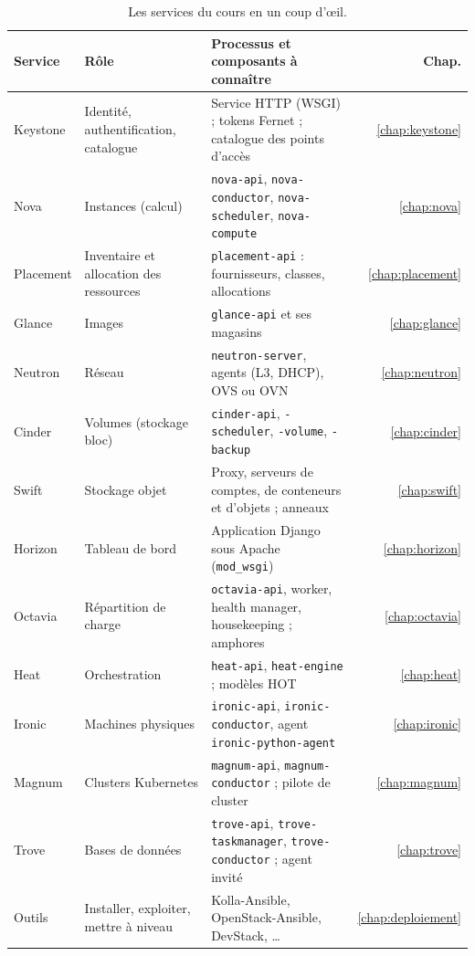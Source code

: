 \begin{table}[!ht]
\centering
\renewcommand{\arraystretch}{1.25}
\small
\begin{tabular}{@{}>{\raggedright\arraybackslash}p{2.0cm}>{\raggedright\arraybackslash}p{3.9cm}>{\raggedright\arraybackslash}p{8.3cm}r@{}}
\toprule
\textbf{Service} & \textbf{Rôle} & \textbf{Processus et composants à connaître} & \textbf{Chap.} \\
\midrule
Keystone & Identité, authentification, catalogue & Service HTTP (WSGI) ; tokens Fernet ; catalogue des points d'accès & \ref{chap:keystone} \\
Nova & Instances (calcul) & \texttt{nova-api}, \texttt{nova-conductor}, \texttt{nova-scheduler}, \texttt{nova-compute} & \ref{chap:nova} \\
Placement & Inventaire et allocation des ressources & \texttt{placement-api} : fournisseurs, classes, allocations & \ref{chap:placement} \\
Glance & Images & \texttt{glance-api} et ses magasins & \ref{chap:glance} \\
Neutron & Réseau & \texttt{neutron-server}, agents (L3, DHCP), OVS ou OVN & \ref{chap:neutron} \\
Cinder & Volumes (stockage bloc) & \texttt{cinder-api}, \texttt{-scheduler}, \texttt{-volume}, \texttt{-backup} & \ref{chap:cinder} \\
Swift & Stockage objet & Proxy, serveurs de comptes, de conteneurs et d'objets ; anneaux & \ref{chap:swift} \\
Horizon & Tableau de bord & Application Django sous Apache (\texttt{mod\_wsgi}) & \ref{chap:horizon} \\
Octavia & Répartition de charge & \texttt{octavia-api}, worker, health manager, housekeeping ; amphores & \ref{chap:octavia} \\
Heat & Orchestration & \texttt{heat-api}, \texttt{heat-engine} ; modèles HOT & \ref{chap:heat} \\
Ironic & Machines physiques & \texttt{ironic-api}, \texttt{ironic-conductor}, agent \texttt{ironic-python-agent} & \ref{chap:ironic} \\
Magnum & Clusters Kubernetes & \texttt{magnum-api}, \texttt{magnum-conductor} ; pilote de cluster & \ref{chap:magnum} \\
Trove & Bases de données & \texttt{trove-api}, \texttt{trove-taskmanager}, \texttt{trove-conductor} ; agent invité & \ref{chap:trove} \\
Outils & Installer, exploiter, mettre à niveau & Kolla-Ansible, OpenStack-Ansible, DevStack, \dots & \ref{chap:deploiement} \\
\bottomrule
\end{tabular}
\caption{Les services du cours en un coup d'œil.}
\label{tab:concl-services}
\end{table}

